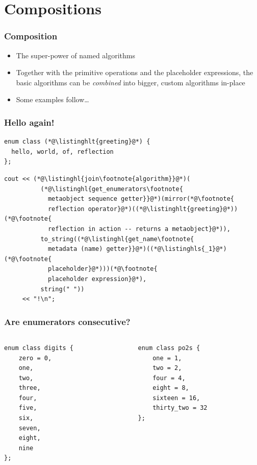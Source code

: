\documentclass[compress,table,xcolor=table]{beamer}
\begin{document}
\section{Compositions}
\begin{frame}
  \frametitle{Composition}
  \larger
  \begin{itemize}
    \item {\larger The {\larger super-power} of named algorithms}
    \item Together with the primitive operations and the placeholder expressions,
      the basic algorithms can be {\em \larger combined} into bigger,
      custom algorithms in-place
    \item Some examples follow\ldots
  \end{itemize}
\end{frame}
\begin{frame}[fragile]
  \frametitle{Hello again!}
  \begin{lstlisting}[language=c++2x,basicstyle=\normalsize\ttfamily]
enum class (*@\listinghlt{greeting}@*) {
  hello, world, of, reflection
};
  \end{lstlisting}
  \begin{lstlisting}[language=c++2x,basicstyle=\normalsize\ttfamily]
cout << (*@\listinghl{join\footnote{algorithm}}@*)(
          (*@\listinghl{get_enumerators\footnote{
            metaobject sequence getter}}@*)(mirror(*@\footnote{
            reflection operator}@*)((*@\listinghlt{greeting}@*))(*@\footnote{
            reflection in action -- returns a metaobject}@*)),
          to_string((*@\listinghl{get_name\footnote{
            metadata (name) getter}}@*)((*@\listinghls{_1}@*)(*@\footnote{
            placeholder}@*)))(*@\footnote{
            placeholder expression}@*),
          string(" "))
     << "!\n";
  \end{lstlisting}
\end{frame}
\begin{frame}[fragile]
  \frametitle{Are enumerators consecutive?}
  \begin{columns}
    \begin{column}{.43\textwidth}
      \begin{lstlisting}[language=c++2x,basicstyle=\small\ttfamily]
enum class digits {
    zero = 0,
    one,
    two,
    three,
    four,
    five,
    six,
    seven,
    eight,
    nine
};
      \end{lstlisting}
    \end{column}
    \begin{column}{.47\textwidth}
      \begin{lstlisting}[language=c++2x,basicstyle=\small\ttfamily]
enum class po2s {
    one = 1,
    two = 2,
    four = 4,
    eight = 8,
    sixteen = 16,
    thirty_two = 32
};
      \end{lstlisting}
    \end{column}
  \end{columns}
\end{frame}
\end{document}
